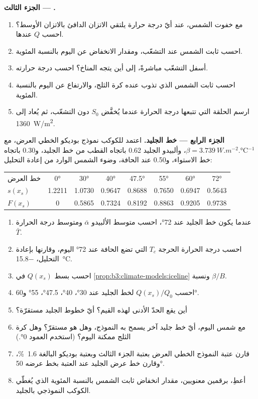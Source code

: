 \begin{problem}
\medskip\noindent\textbf{الجزء الثالث --- .}
\begin{enumerate}[resume]
\item مع خفوت الشمس، عند أيّ درجة حرارة يلتقي الاتزان الدافئ
  بالاتزان الأوسط؟ احسب $Q$ عندها.
\item احسب ثابت الشمس عند التشعّب، ومقدار الانخفاض عن
  اليوم بالنسبة المئوية.
\item أسفل التشعّب مباشرةً، إلى أين يتجه المناخ؟ احسب درجة حرارته.
\item احسب ثابت الشمس الذي تذوب عنده كرة الثلج، والارتفاع
  عن اليوم بالنسبة المئوية.
\item ارسم الحلقة التي تتبعها درجة الحرارة عندما يُخفَّض $S_0$
  دون التشعّب، ثم يُعاد إلى \qty{1360}{W/m^2}.
\end{enumerate}

\medskip\noindent\textbf{الجزء الرابع --- خط الجليد.} اعتمد للكوكب
نموذج بوديكو الخطي العرض، مع $\beta = \qty{3.739}{W.m^{-2}.\celsius^{-1}}$،
وألبيدو الجليد 0.62 باتجاه القطب من خط الجليد، و0.30 باتجاه خط الاستواء، و0.50 عند
الحافة، وضوء الشمس الوارد من إعادة التحليل:
\begin{center}
\begin{tabular}{lccccccc}
\hline
خط العرض & \ang{0} & \ang{30} & \ang{40} & \ang{47.5} & \ang{55} & \ang{60} & \ang{72}\\
$s(x_s)$ & 1.2211 & 1.0730 & 0.9647 & 0.8688 & 0.7650 & 0.6947 & 0.5643\\
$F(x_s)$ & 0 & 0.5865 & 0.7324 & 0.8192 & 0.8863 & 0.9205 & 0.9738\\
\hline
\end{tabular}
\end{center}
\begin{enumerate}[resume]
\item عندما يكون خط الجليد عند \ang{72}، احسب متوسط الألبيدو $\bar\alpha$
  ومتوسط درجة الحرارة $\bar T$.
\item احسب درجة الحرارة الحرجة $T_c$ التي تضع الحافة عند
  \ang{72} اليوم، وقارنها بإعادة التحليل، \qty{-15.8}{\celsius}.
\item احسب بسط $Q(x_s)$ في \cref{prop:b3:climate-models:iceline}
  ونسبة $\beta/B$.
\item احسب $Q(x_s)/Q_0$ لخط الجليد عند \ang{30}، \ang{40}،
  \ang{47.5}، \ang{55} و\ang{60}.
\item أين يقع الحدّ الأدنى لهذه القيم؟ أيّ خطوط الجليد مستقرّة؟
\item مع شمس اليوم، أيّ خط جليد آخر يسمح به النموذج، وهل هو
  مستقرّ؟ وهل كرة الثلج ممكنة اليوم؟ (استخدم العمود \ang{0}.)
\item قارن عتبة النموذج الخطي العرض بعتبة الجزء الثالث
  وبعتبة بوديكو البالغة \qty{1.6}{\percent}، وقارن خط عرض الجليد عند العتبة
  بخط عرضه \ang{50}.
\item أعطِ، برقمين معنويين، مقدار انخفاض ثابت الشمس
  بالنسبة المئوية الذي يُغطّي الكوكب النموذجي بالجليد.
\end{enumerate}
\end{problem}
